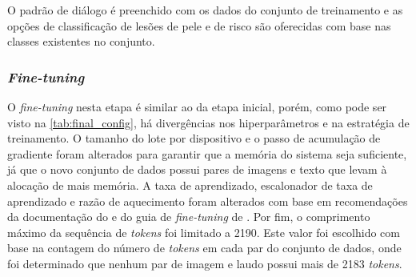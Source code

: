 O padrão de diálogo é preenchido com os dados do conjunto de treinamento e as opções de classificação de lesões de pele
e de risco são oferecidas com base nas classes existentes no conjunto.

\subsubsection{\textit{Fine-tuning}}

O \textit{fine-tuning} nesta etapa é similar ao da etapa inicial, porém, como pode ser visto na
\autoref{tab:final_config}, há divergências nos hiperparâmetros e na estratégia de treinamento. O tamanho do lote por
dispositivo e o passo de acumulação de gradiente foram alterados para garantir que a memória do sistema seja
suficiente, já que o novo conjunto de dados possui pares de imagens e texto que levam à alocação de mais memória. A
taxa de aprendizado, escalonador de taxa de aprendizado e razão de aquecimento foram alterados com base em
recomendações da documentação do \textcite{unsloth2025lora} e do guia de \textit{fine-tuning} de
\textcite{parthasarathy2024ultimate}. Por fim, o comprimento máximo da sequência de \textit{tokens} foi limitado a
2190. Este valor foi escolhido com base na contagem do número de \textit{tokens} em cada par do conjunto de
dados, onde foi determinado que nenhum par de imagem e laudo possui mais de 2183 \textit{tokens}.

